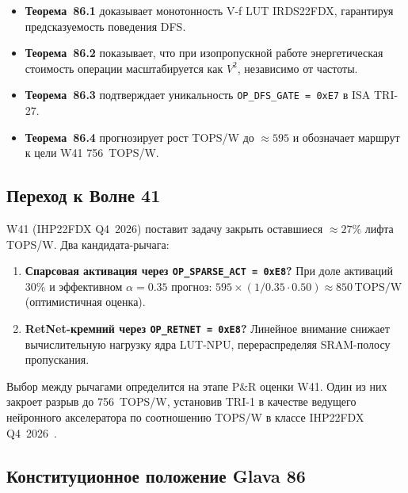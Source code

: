 \begin{itemize}
  \item \textbf{Теорема~86.1} доказывает монотонность V-f LUT IRDS22FDX,
        гарантируя предсказуемость поведения DFS.
  \item \textbf{Теорема~86.2} показывает, что при изопропускной работе
        энергетическая стоимость операции масштабируется как $V^2$,
        независимо от частоты.
  \item \textbf{Теорема~86.3} подтверждает уникальность
        \texttt{OP\_DFS\_GATE = 0xE7} в ISA TRI-27.
  \item \textbf{Теорема~86.4} прогнозирует рост TOPS/W до $\approx 595$
        и обозначает маршрут к цели W41 756~TOPS/W.
\end{itemize}

\subsection{Переход к Волне 41}
\label{subsec:w41-transition}

W41 (IHP22FDX Q4~2026) поставит задачу закрыть оставшиеся $\approx 27\%$
лифта TOPS/W.  Два кандидата-рычага:
\begin{enumerate}
  \item \textbf{Спарсовая активация через \texttt{OP\_SPARSE\_ACT = 0xE8}?}
        При доле активаций $30\%$ и эффективном $\alpha = 0{.}35$
        прогноз: $595 \times (1/0{.}35 \cdot 0{.}50) \approx 850\,\text{TOPS/W}$
        (оптимистичная оценка).
  \item \textbf{RetNet-кремний через \texttt{OP\_RETNET = 0xE8}?}
        Линейное внимание снижает вычислительную нагрузку ядра LUT-NPU,
        перераспределяя SRAM-полосу пропускания.
\end{enumerate}

Выбор между рычагами определится на этапе P\&R оценки W41.
Один из них закроет разрыв до 756~TOPS/W, установив TRI-1 в качестве
ведущего нейронного акселератора по соотношению TOPS/W
в классе IHP22FDX Q4~2026~\cite{IRDS2023-MoreMoore}.

\subsection{Конституционное положение Glava 86}
\label{subsec:constitutional-status}

